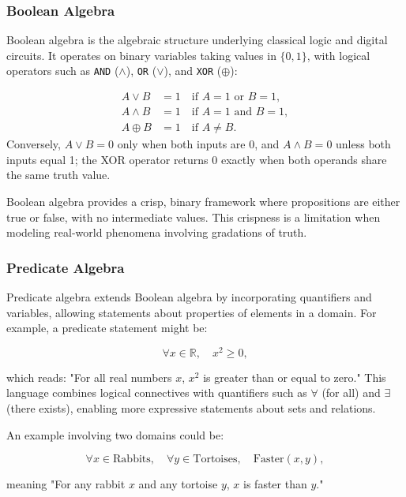 \subsubsection{Boolean Algebra}
\label{sec:softcomp_boolean_algebra_sub}

Boolean algebra is the algebraic structure underlying classical logic and digital circuits. It operates on binary variables taking values in $\{0,1\}$, with logical operators such as \texttt{AND} ($\wedge$), \texttt{OR} ($\vee$), and \texttt{XOR} ($\oplus$):

\begin{align*}
A \vee B &= 1 \quad \text{if } A=1 \text{ or } B=1, \\
A \wedge B &= 1 \quad \text{if } A=1 \text{ and } B=1, \\
A \oplus B &= 1 \quad \text{if } A \neq B.
\end{align*}
Conversely, \(A \vee B = 0\) only when both inputs are 0, and \(A \wedge B = 0\) unless both inputs equal 1; the XOR operator returns 0 exactly when both operands share the same truth value.

Boolean algebra provides a crisp, binary framework where propositions are either true or false, with no intermediate values. This crispness is a limitation when modeling real-world phenomena involving gradations of truth.

\subsubsection{Predicate Algebra}
\label{sec:softcomp_predicate_algebra_sub}

Predicate algebra extends Boolean algebra by incorporating quantifiers and variables, allowing statements about properties of elements in a domain. For example, a predicate statement might be:

\[
\forall x \in \mathbb{R}, \quad x^2 \geq 0,
\]

which reads: "For all real numbers $x$, $x^2$ is greater than or equal to zero." This language combines logical connectives with quantifiers such as $\forall$ (for all) and $\exists$ (there exists), enabling more expressive statements about sets and relations.

An example involving two domains could be:

\[
\forall x \in \text{Rabbits}, \quad \forall y \in \text{Tortoises}, \quad \text{Faster}(x, y),
\]

meaning "For any rabbit $x$ and any tortoise $y$, $x$ is faster than $y$."

